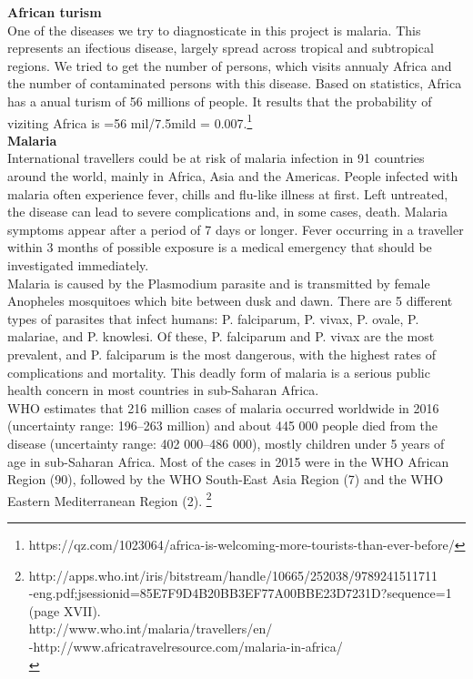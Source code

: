 \textbf{African turism}\\
\tab One of the diseases we try to diagnosticate in this project is malaria. This represents an ifectious disease, largely spread across tropical and subtropical regions. We tried to get the number of persons, which visits annualy Africa and the number of contaminated persons with this disease. Based on statistics, Africa has a anual turism of 56 millions of people. It results that the probability of viziting Africa is =56 mil/7.5mild = 0.007.\footnote{https://qz.com/1023064/africa-is-welcoming-more-tourists-than-ever-before/}\\

\textbf{Malaria}\\
\tab International travellers could be at risk of malaria infection in 91 countries around the world, mainly in Africa, Asia and the Americas. People infected with malaria often experience fever, chills and flu-like illness at first. Left untreated, the disease can lead to severe complications and, in some cases, death. Malaria symptoms appear after a period of 7 days or longer. Fever occurring in a traveller within 3 months of possible exposure is a medical emergency that should be investigated immediately.\\

\tab Malaria is caused by the Plasmodium parasite and is transmitted by female Anopheles mosquitoes which bite between dusk and dawn. There are 5 different types of parasites that infect humans: P. falciparum, P. vivax, P. ovale, P. malariae, and P. knowlesi. Of these, P. falciparum and P. vivax are the most prevalent, and P. falciparum is the most dangerous, with the highest rates of complications and mortality. This deadly form of malaria is a serious public health concern in most countries in sub-Saharan Africa.\\

\tab WHO estimates that 216 million cases of malaria occurred worldwide in 2016 (uncertainty range: 196–263 million) and about 445 000 people died from the disease (uncertainty range: 402 000–486 000), mostly children under 5 years of age in sub-Saharan Africa. Most of the cases in 2015 were in the WHO African Region (90), followed by the WHO South-East Asia Region (7) and the WHO Eastern Mediterranean Region (2). \footnote{
 http://apps.who.int/iris/bitstream/handle/10665/252038/9789241511711\\-eng.pdf;jsessionid=85E7F9D4B20BB3EF77A00BBE23D7231D?sequence=1  (page XVII).\\
 http://www.who.int/malaria/travellers/en/\\
 -http://www.africatravelresource.com/malaria-in-africa/\\
} 

